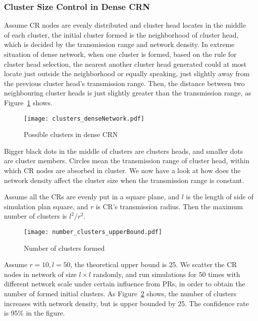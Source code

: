 \subsubsection{Cluster Size Control in Dense CRN}
\label{cluster_pruning}
Assume CR nodes are evenly distributed and cluster head locates in the middle of each cluster, the initial cluster formed is the neighborhood of cluster head, which is decided by the transmission range and network density.
In extreme situation of dense network, when one cluster is formed, based on the rule for cluster head selection, the nearest another cluster head generated could at most locate just outside the neighborhood or equally speaking, just slightly away from the previous cluster head's transmission range.
Then, the distance between two neighbouring cluster heads is just slightly greater than the transmission range, as Figure~\ref{clusters_denseNetwork} shows.
\begin{figure}[ht!]
  \centering
  \texttt{[image: clusters\_denseNetwork.pdf]}
  \caption{Possible clusters in dense CRN}
  \label{clusters_denseNetwork}
\end{figure}
Bigger black dots in the middle of clusters are clusters heads, and smaller dots are cluster members.
Circles mean the transmission range of cluster head, within which CR nodes are absorbed in cluster.
We now have a look at how does the network density affect the cluster size when the transmission range is constant.

Assume all the CRs are evenly put in a square plane, and $l$ is the length of side of simulation plan square, and $r$ is CR's transmission radius.
Then the maximum number of clusters is $l^2/r^2$.

\begin{figure}[ht!]
  \centering
  \texttt{[image: number\_clusters\_upperBound.pdf]}
  \caption{Number of clusters formed}
  \label{number_clusters_scale}
\end{figure}
Assume $r=10, l=50$, the theoretical upper bound is 25. 
We scatter the CR nodes in network of size $l\times l$ randomly, and run simulations for 50 times with different network scale under certain influence from PRs, in order to obtain the number of formed initial clusters.
As Figure~\ref{number_clusters_scale} shows, the number of clusters increases with network density, but is upper bounded by 25.
The confidence rate is 95\% in the figure.

